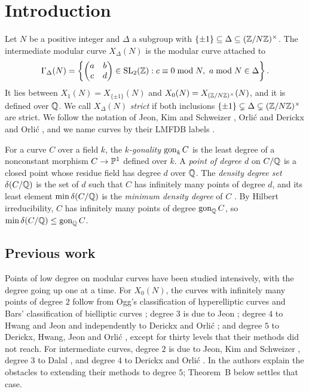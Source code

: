 \section{Introduction}

Let $N$ be a positive integer and $\Delta$ a subgroup with $\{\pm1\}\subseteq\Delta\subseteq(\mathbb{Z}/N\mathbb{Z})^\times$.
The intermediate modular curve $X_\Delta(N)$ is the modular curve attached to
\[
 \Gamma_\Delta(N)=\left\{\begin{pmatrix}a&b\\c&d\end{pmatrix}\in\operatorname{SL}_2(\mathbb{Z}): c\equiv 0 \bmod N,\ a \bmod N\in\Delta\right\}.
\]
It lies between $X_1(N)=X_{\{\pm1\}}(N)$ and $X_0(N)=X_{(\mathbb{Z}/N\mathbb{Z})^\times}(N)$, and it is defined over $\mathbb{Q}$.
We call $X_\Delta(N)$ \emph{strict} if both inclusions $\{\pm1\}\subsetneq\Delta\subsetneq(\mathbb{Z}/N\mathbb{Z})^\times$
are strict. We follow the notation of Jeon, Kim and Schweizer \cite{JeonKimSchweizer2020}, Orli\'c
\cite{Orlic2025} and Derickx and Orli\'c \cite{DerickxOrlic2026}, and we name curves by their LMFDB labels
\cite{LMFDB,RSZB2022}.

For a curve $C$ over a field $k$, the \emph{$k$-gonality} $\operatorname{gon}_k C$ is the least degree of a nonconstant
morphism $C\to\mathbb{P}^1$ defined over $k$. A \emph{point of degree $d$} on $C/\mathbb{Q}$ is a closed point whose residue
field has degree $d$ over $\mathbb{Q}$. The \emph{density degree set} $\delta(C/\mathbb{Q})$ is the set of $d$ such that
$C$ has infinitely many points of degree $d$, and its least element $\min\delta(C/\mathbb{Q})$ is the \emph{minimum
density degree} of $C$ \cite{KadetsVogt2025}. By Hilbert irreducibility, $C$ has infinitely many points of
degree $\operatorname{gon}_{\mathbb{Q}} C$, so $\min\delta(C/\mathbb{Q})\le\operatorname{gon}_{\mathbb{Q}} C$.

\subsection{Previous work}
Points of low degree on modular curves have been studied intensively, with the degree going up one at a
time. For $X_0(N)$, the curves with infinitely many points of degree $2$ follow from Ogg's classification of
hyperelliptic curves \cite{Ogg1974} and Bars' classification of bielliptic curves \cite{Bars1999}; degree
$3$ is due to Jeon \cite{Jeon2021}; degree $4$ to Hwang and Jeon \cite{HwangJeon2024} and independently to
Derickx and Orli\'c \cite{DerickxOrlicX0}; and degree $5$ to Derickx, Hwang, Jeon and Orli\'c \cite{DHJO},
except for thirty levels that their methods did not reach. For intermediate curves, degree $2$ is due to
Jeon, Kim and Schweizer \cite{JeonKimSchweizer2020}, degree $3$ to Dalal \cite{Dalal2024}, and degree
$4$ to Derickx and Orli\'c \cite{DerickxOrlic2026}. In \cite{DerickxOrlic2026} the authors explain the obstacles to extending
their methods to degree $5$; Theorem~B below settles that case.

